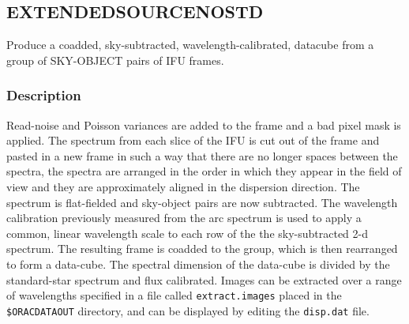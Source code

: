 \documentclass[twoside,11pt]{article}
\renewcommand{\_}{\texttt{\symbol{95}}}
\begin{document}
\clearpage


\subsection{EXTENDED\_SOURCE\_NOSTD}

Produce a coadded, sky-subtracted, wavelength-calibrated,
datacube from a group of SKY-OBJECT pairs of IFU
frames.

\subsubsection*{Description}

Read-noise and Poisson variances are added to the frame and a bad
pixel mask is applied. The spectrum from each slice of the IFU is cut
out of the frame and pasted in a new frame in such a way that there
are no longer spaces between the spectra, the spectra are arranged in
the order in which they appear in the field of view and they are
approximately aligned in the dispersion direction. The spectrum is
flat-fielded and sky-object pairs are now subtracted.  The wavelength
calibration previously measured from the arc spectrum is used to apply
a common, linear wavelength scale to each row of the the
sky-subtracted 2-d spectrum.  The resulting frame is coadded to the
group, which is then rearranged to form a data-cube. The spectral
dimension of the data-cube is divided by the standard-star spectrum
and flux calibrated. Images can be extracted over a range of
wavelengths specified in a file called {\tt extract.images} placed in
the {\tt \$ORAC\_DATA\_OUT} directory, and can be displayed by editing
the {\tt disp.dat} file.
\end{document}
